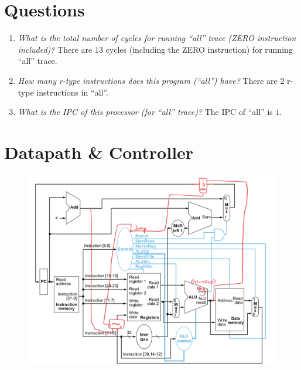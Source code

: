 \documentclass{report}
\begin{document}
\section*{Questions}
\begin{enumerate}
    \item \textit{What is the total number of cycles for running ``all'' trace (ZERO instruction included)?}
        \newline
        \newline
        There are $13$ cycles (including the ZERO instruction) for running ``all'' trace.
    \item \textit{How many r-type instructions does this program (``all'') have?}
        \newline
        \newline
        There are $2$ r-type instructions in ``all''.
    \item \textit{What is the IPC of this processor (for ``all'' trace)?}
        \newline
        \newline
        The IPC of ``all'' is $1$.
\end{enumerate}


\section*{Datapath \& Controller}
\begin{figure}[ht]
\centering
\includegraphics[width=\textwidth]{datapath}
\end{figure}


\newpage
\end{document}
